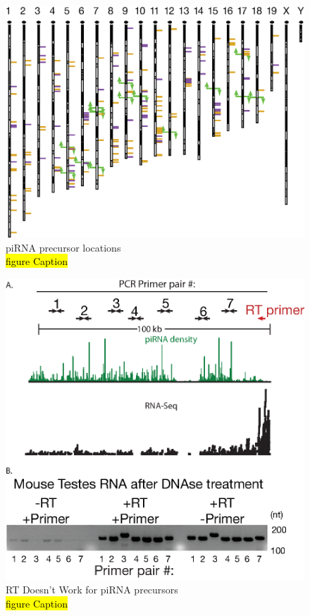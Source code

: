 \begin{figure}[htbp]
	\centering 
	\includegraphics{Figures/Chapter2/PrecursorLocations.eps}
	\caption[piRNA precursor locations]
	{
		piRNA precursor locations\\
		\hl{figure Caption}
	}
	\label{fig:Hiv tx via SeqZip}
\end{figure}




\begin{figure}[htbp]
	\centering 
	\includegraphics{Figures/Chapter2/RTDoesntWork.eps}
	\caption[pRT Doesn't Work for piRNA precursors]
	{
		RT Doesn't Work for piRNA precursors\\
		\hl{figure Caption}
	}
	\label{fig:Hiv tx via SeqZip}
\end{figure}



